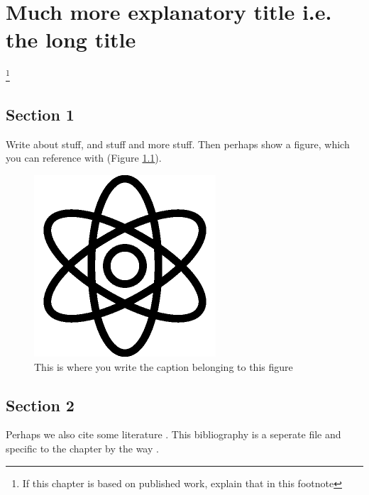 

\chapter[Short title]{Much more explanatory title i.e. the long title}\label{chap:LABELTITLE4}
\footnote{If this chapter is based on published work, explain that in this footnote} 

\begin{refsection}


\newpage	
\section{Section 1}

Write about stuff, and stuff and more stuff. Then perhaps show a figure, which you can reference with (Figure \ref{fig:LABELFORFIG4_1}).

\begin{figure}
\begin{center}
\includegraphics[width=0.7\columnwidth]{./C4_Topic3/figure_1/fig1.png}
\caption{\label{fig:LABELFORFIG4_1} This is where you write the caption belonging to this figure}
\end{center}
\end{figure}


\section{Section 2}

Perhaps we also cite some literature \cite{Marion1995}. This bibliography is a seperate file and specific to the chapter by the way  \cite{Marion1995, rezakhaniha2012}.


\end{refsection}
